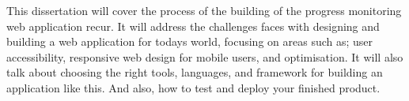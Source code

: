 This dissertation will cover the process of the building of the progress monitoring web application recur. It will address the challenges faces with designing and building a web application for todays world, focusing on areas such as; user accessibility, responsive web design for mobile users, and optimisation. It will also talk about choosing the right tools, languages, and framework for building an application like this. And also, how to test and deploy your finished product.
